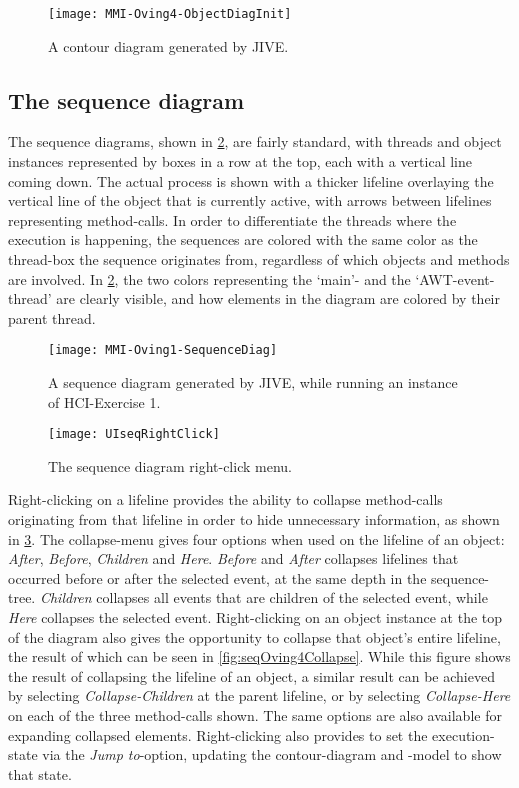 \begin{figure}[H]
	\centering
	\texttt{[image: MMI-Oving4-ObjectDiagInit]}
	\caption{A contour diagram generated by JIVE.}
	\label{fig:contOving4Init}
\end{figure}

\subsection{The sequence diagram}\label{jiveFeatSequenceDiag}

The sequence diagrams, shown in \cref{fig:seqOving1}, are fairly standard, with threads and object instances represented by boxes in a row at the top, each with a vertical line coming down.
The actual process is shown with a thicker lifeline overlaying the vertical line of the object that is currently active, with arrows between lifelines representing method-calls.
In order to differentiate the threads where the execution is happening, the sequences are colored with the same color as the thread-box the sequence originates from, regardless of which objects and methods are involved.
In \cref{fig:seqOving1}, the two colors representing the `main'- and the `AWT-event-thread' are clearly visible, and how elements in the diagram are colored by their parent thread.

\begin{figure}[H]
	\centering
	\texttt{[image: MMI-Oving1-SequenceDiag]}
	\caption{A sequence diagram generated by JIVE, while running an instance of HCI-Exercise 1.}
	\label{fig:seqOving1}
\end{figure}

\begin{figure}[H]
	\centering
	\texttt{[image: UIseqRightClick]}
	\caption{The sequence diagram right-click menu.}
	\label{fig:UIseqRightClick}
\end{figure}

Right-clicking on a \gls{lifeline} provides the ability to collapse method-calls originating from that lifeline in order to hide unnecessary information, as shown in \cref{fig:UIseqRightClick}.
The collapse-menu gives four options when used on the lifeline of an object: \emph{After}, \emph{Before}, \emph{Children} and \emph{Here}.
\emph{Before} and \emph{After} collapses lifelines that occurred before or after the selected event, at the same depth in the sequence-tree.
\emph{Children} collapses all events that are children of the selected event, while \emph{Here} collapses the selected event.
Right-clicking on an object instance at the top of the diagram also gives the opportunity to collapse that object's entire lifeline, the result of which can be seen in \cref{fig:seqOving4Collapse}.
While this figure shows the result of collapsing the lifeline of an object, a similar result can be achieved by selecting \emph{Collapse-Children} at the parent lifeline, or by selecting \emph{Collapse-Here} on each of the three method-calls shown.
The same options are also available for expanding collapsed elements.
Right-clicking also provides to set the execution-state via the \emph{Jump to}-option, updating the contour-diagram and -model to show that state.


